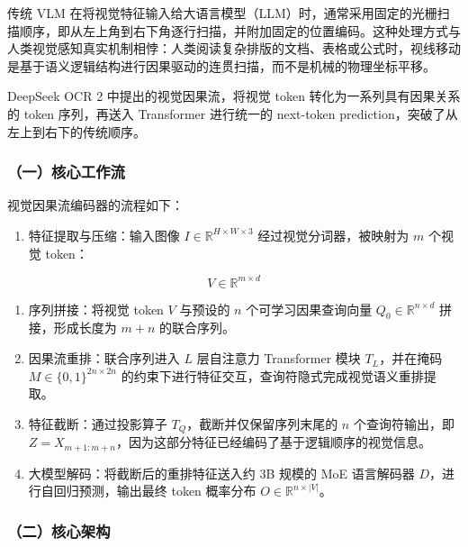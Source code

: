 传统 VLM 在将视觉特征输入给大语言模型（LLM）时，通常采用固定的光栅扫描顺序，即从左上角到右下角逐行扫描，并附加固定的位置编码。这种处理方式与人类视觉感知真实机制相悖：人类阅读复杂排版的文档、表格或公式时，视线移动是基于语义逻辑结构进行因果驱动的连贯扫描，而不是机械的物理坐标平移。

DeepSeek OCR 2 中提出的视觉因果流，将视觉 token 转化为一系列具有因果关系的 token 序列，再送入 Transformer 进行统一的 next-token prediction，突破了从左上到右下的传统顺序。

\hypertarget{ux4e00ux6838ux5fc3ux5de5ux4f5cux6d41}{%
\subsubsection{（一）核心工作流}\label{ux4e00ux6838ux5fc3ux5de5ux4f5cux6d41}}

视觉因果流编码器的流程如下：

\begin{enumerate}
\def\labelenumi{\arabic{enumi}.}
\tightlist
\item
  特征提取与压缩：输入图像 \(I\in\mathbb{R}^{H\times W\times 3}\) 经过视觉分词器，被映射为 \(m\) 个视觉 token：
\end{enumerate}

\[
V\in\mathbb{R}^{m\times d}
\]

\begin{enumerate}
\def\labelenumi{\arabic{enumi}.}
\setcounter{enumi}{1}
\tightlist
\item
  序列拼接：将视觉 token \(V\) 与预设的 \(n\) 个可学习因果查询向量 \(Q_0\in\mathbb{R}^{n\times d}\) 拼接，形成长度为 \(m+n\) 的联合序列。
\item
  因果流重排：联合序列进入 \(L\) 层自注意力 Transformer 模块 \(T_L\)，并在掩码 \(M\in\{0,1\}^{2n\times2n}\) 的约束下进行特征交互，查询符隐式完成视觉语义重排提取。
\item
  特征截断：通过投影算子 \(T_Q\)，截断并仅保留序列末尾的 \(n\) 个查询符输出，即 \(Z=X_{m+1:m+n}\)，因为这部分特征已经编码了基于逻辑顺序的视觉信息。
\item
  大模型解码：将截断后的重排特征送入约 3B 规模的 MoE 语言解码器 \(D\)，进行自回归预测，输出最终 token 概率分布 \(O\in\mathbb{R}^{n\times |V|}\)。
\end{enumerate}

\hypertarget{ux4e8cux6838ux5fc3ux67b6ux6784-3}{%
\subsubsection{（二）核心架构}\label{ux4e8cux6838ux5fc3ux67b6ux6784-3}}


